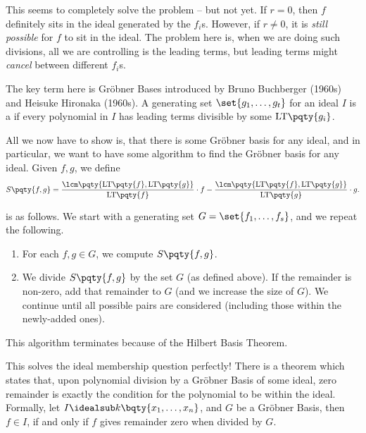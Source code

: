 This seems to completely solve the problem -- but not yet. If \(r = 0\), then \(f\) definitely sits in the ideal generated by the \(f_i\)s. However, if \(r \neq 0\), it is \emph{still possible} for \(f\) to sit in the ideal. The problem here is, when we are doing such divisions, all we are controlling is the leading terms, but leading terms might \emph{cancel} between different \(f_i\)s.

The key term here is Gr\"{o}bner Bases introduced by Bruno Buchberger (1960s) and Heisuke Hironaka (1960s). A generating set \(\set{g_1, \ldots, g_t}\) for an ideal \(I\) is a  if every polynomial in \(I\) has leading terms divisible by some \(\text{LT}\pqty{g_i}\).

All we now have to show is, that there is some Gr\"{o}bner basis for any ideal, and in particular, we want to have some algorithm to find the Gr\"{o}bner basis for any ideal. Given \(f, g\), we define
\[
    S\pqty{f, g} = \frac{\lcm \pqty{\text{LT} \pqty{f}, \text{LT} \pqty{g}}}{\text{LT} \pqty{f}} \cdot f - \frac{\lcm \pqty{\text{LT} \pqty{f}, \text{LT} \pqty{g}}}{\text{LT} \pqty{g}} \cdot g.
\]

 is as follows. We start with a generating set \(G = \set{f_1, \ldots, f_s}\), and we repeat the following.

\begin{enumerate}
    \item For each \(f, g \in G\), we compute \(S\pqty{f, g}\).
    \item We divide \(S\pqty{f, g}\) by the set \(G\) (as defined above). If the remainder is non-zero, add that remainder to \(G\) (and we increase the size of \(G\)). We continue until all possible pairs are considered (including those within the newly-added ones).
\end{enumerate}

This algorithm terminates because of the Hilbert Basis Theorem.

This solves the ideal membership question perfectly! There is a theorem which states that, upon polynomial division by a Gr\"{o}bner Basis of some ideal, zero remainder is exactly the condition for the polynomial to be within the ideal. Formally, let \(I \idealsub k\bqty{x_1, \ldots , x_n}\), and \(G\) be a Gr\"{o}bner Basis, then \(f \in I\), if and only if \(f\) gives remainder zero when divided by \(G\).